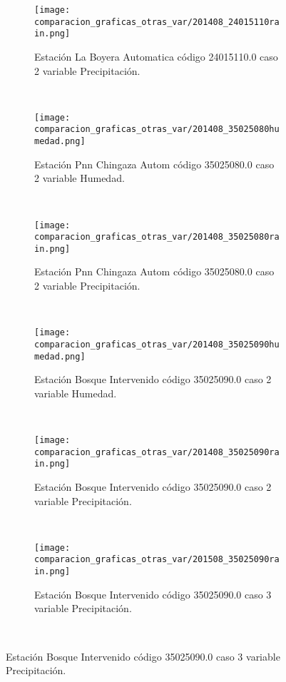 \begin{figure}[H]
\centering
\begin{subfigure}[normla]{0.4\textwidth}
\caption{Estación La Boyera Automatica código 24015110.0 caso 2 variable Precipitación.}
\texttt{[image: comparacion\_graficas\_otras\_var/201408\_24015110rain.png]}
\end{subfigure}
~
\begin{subfigure}[normla]{0.4\textwidth}
\caption{Estación Pnn Chingaza Autom  código 35025080.0 caso 2 variable Humedad.}
\texttt{[image: comparacion\_graficas\_otras\_var/201408\_35025080humedad.png]}
\end{subfigure}
~
\begin{subfigure}[normla]{0.4\textwidth}
\caption{Estación Pnn Chingaza Autom  código 35025080.0 caso 2 variable Precipitación.}
\texttt{[image: comparacion\_graficas\_otras\_var/201408\_35025080rain.png]}
\end{subfigure}
~
\begin{subfigure}[normla]{0.4\textwidth}
\caption{Estación Bosque Intervenido   código 35025090.0 caso 2 variable Humedad.}
\texttt{[image: comparacion\_graficas\_otras\_var/201408\_35025090humedad.png]}
\end{subfigure}
~
\begin{subfigure}[normla]{0.4\textwidth}
\caption{Estación Bosque Intervenido   código 35025090.0 caso 2 variable Precipitación.}
\texttt{[image: comparacion\_graficas\_otras\_var/201408\_35025090rain.png]}
\end{subfigure}
~
\begin{subfigure}[normla]{0.4\textwidth}
\caption{Estación Bosque Intervenido   código 35025090.0 caso 3 variable Precipitación.}
\texttt{[image: comparacion\_graficas\_otras\_var/201508\_35025090rain.png]}
\end{subfigure}
~
\end{figure}
           
